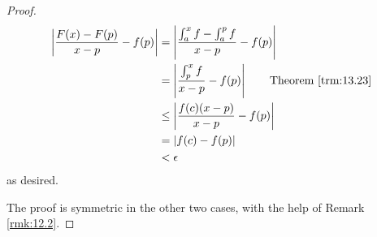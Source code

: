 \documentclass[../main.tex]{subfiles}
\begin{document}
\begin{theorem}
\begin{proof}
\begin{align*}
            \left| \frac{F(x)-F(p)}{x-p}-f(p) \right| &= \left| \frac{\int_a^xf-\int_a^pf}{x-p}-f(p) \right|\\
            &= \left| \frac{\int_p^xf}{x-p}-f(p) \right|\tag*{Theorem \ref{trm:13.23}}\\
            &\leq \left| \frac{f(c)(x-p)}{x-p}-f(p) \right|\\
            &= |f(c)-f(p)|\\
            &< \epsilon
        \end{align*}
        \endgroup
        as desired.\par
        The proof is symmetric in the other two cases, with the help of Remark \ref{rmk:12.2}.
    \end{proof}
\end{theorem}
\end{document}
